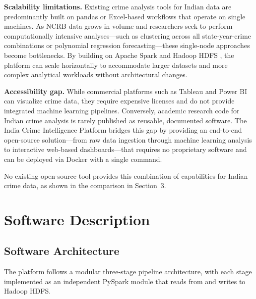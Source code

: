 \documentclass[a4paper,12pt]{article}
\begin{document}
\textbf{Scalability limitations.} Existing crime analysis tools for Indian data are predominantly built on pandas or Excel-based workflows that operate on single machines. As NCRB data grows in volume and researchers seek to perform computationally intensive analyses---such as clustering across all state-year-crime combinations or polynomial regression forecasting---these single-node approaches become bottlenecks. By building on Apache Spark and Hadoop HDFS \cite{hdfs2023, zaharia2016}, the platform can scale horizontally to accommodate larger datasets and more complex analytical workloads without architectural changes.

\textbf{Accessibility gap.} While commercial platforms such as Tableau and Power BI can visualize crime data, they require expensive licenses and do not provide integrated machine learning pipelines. Conversely, academic research code for Indian crime analysis is rarely published as reusable, documented software. The India Crime Intelligence Platform bridges this gap by providing an end-to-end open-source solution---from raw data ingestion through machine learning analysis to interactive web-based dashboards---that requires no proprietary software and can be deployed via Docker with a single command.

No existing open-source tool provides this combination of capabilities for Indian crime data, as shown in the comparison in Section~3.

\section{Software Description}

\subsection{Software Architecture}

The platform follows a modular three-stage pipeline architecture, with each stage implemented as an independent PySpark module that reads from and writes to Hadoop HDFS.
\end{document}
